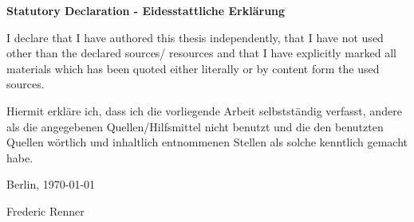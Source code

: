 \begin{center}
    \textbf{Statutory Declaration - Eidesstattliche Erklärung}
\end{center}

I declare that I have authored this thesis independently, that I have not used other than the declared sources/ resources and that I have explicitly marked all materials which has been quoted either literally or by content form the used sources.
\par
Hiermit erkläre ich, dass ich die vorliegende Arbeit selbstständig verfasst, andere als die angegebenen Quellen/Hilfsmittel nicht benutzt und die den benutzten Quellen wörtlich und inhaltlich entnommenen Stellen als solche kenntlich gemacht habe.

\begin{flushright}
\vspace{1.5cm}
Berlin, \today
\vspace{2cm}

\makebox[5cm]{\hrulefill}

Frederic Renner
\end{flushright}